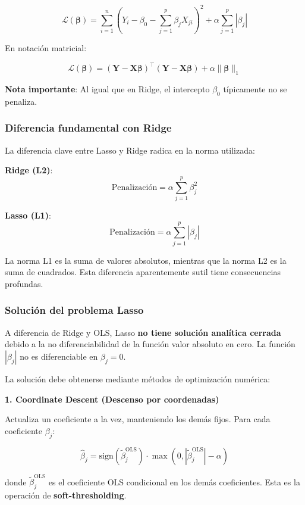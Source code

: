 \documentclass[
  doc,
  floatsintext,
  longtable,
  a4paper,
  nolmodern,
  notxfonts,
  notimes,
  12pt,
  colorlinks=true,linkcolor=blue,citecolor=blue,urlcolor=blue]{apa7}
\begin{document}
\[
\mathcal{L}(\boldsymbol{\beta}) = \sum_{i=1}^{n} \left(Y_i - \beta_0 - \sum_{j=1}^{p} \beta_j X_{ji}\right)^2 + \alpha \sum_{j=1}^{p} |\beta_j|
\]

En notación matricial:

\[
\mathcal{L}(\boldsymbol{\beta}) = (\mathbf{Y} - \mathbf{X}\boldsymbol{\beta})^\top(\mathbf{Y} - \mathbf{X}\boldsymbol{\beta}) + \alpha \|\boldsymbol{\beta}\|_1
\]

\textbf{Nota importante}: Al igual que en Ridge, el intercepto
\(\beta_0\) típicamente no se penaliza.

\subsubsection{Diferencia fundamental con
Ridge}\label{diferencia-fundamental-con-ridge}

La diferencia clave entre Lasso y Ridge radica en la norma utilizada:

\textbf{Ridge (L2)}: \[
\text{Penalización} = \alpha \sum_{j=1}^{p} \beta_j^2
\]

\textbf{Lasso (L1)}: \[
\text{Penalización} = \alpha \sum_{j=1}^{p} |\beta_j|
\]

La norma L1 es la suma de valores absolutos, mientras que la norma L2 es
la suma de cuadrados. Esta diferencia aparentemente sutil tiene
consecuencias profundas.

\subsubsection{Solución del problema
Lasso}\label{soluciuxf3n-del-problema-lasso}

A diferencia de Ridge y OLS, Lasso \textbf{no tiene solución analítica
cerrada} debido a la no diferenciabilidad de la función valor absoluto
en cero. La función \(|\beta_j|\) no es diferenciable en
\(\beta_j = 0\).

La solución debe obtenerse mediante métodos de optimización numérica:

\textbf{1. Coordinate Descent (Descenso por coordenadas)}

Actualiza un coeficiente a la vez, manteniendo los demás fijos. Para
cada coeficiente \(\beta_j\):

\[
\hat{\beta}_j = \text{sign}(\tilde{\beta}_j^{\text{OLS}}) \cdot \max(0, |\tilde{\beta}_j^{\text{OLS}}| - \alpha)
\]

donde \(\tilde{\beta}_j^{\text{OLS}}\) es el coeficiente OLS condicional
en los demás coeficientes. Esta es la operación de
\textbf{soft-thresholding}.
\end{document}
